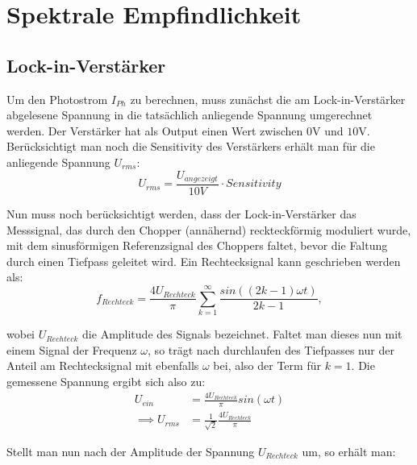 

\section{Spektrale Empfindlichkeit}
\subsection{Lock-in-Verstärker}
Um den Photostrom $I_{Ph}$ zu berechnen, muss zunächst die am Lock-in-Verstärker abgelesene Spannung in die tatsächlich anliegende Spannung umgerechnet werden. Der Verstärker hat als Output einen Wert zwischen $0$V und $10$V. Berücksichtigt man noch die Sensitivity des Verstärkers erhält man für die anliegende Spannung $U_{rms}$: \\

\begin{equation}
U_{rms} = \frac{U_{angezeigt}}{10V} \cdot Sensitivity
\end{equation}

Nun muss noch berücksichtigt werden, dass der Lock-in-Verstärker das Messsignal, das durch den Chopper (annähernd) reckteckförmig moduliert wurde, mit dem sinusförmigen Referenzsignal des Choppers faltet, bevor die Faltung durch einen Tiefpass geleitet wird. Ein Rechtecksignal kann geschrieben werden als:\\

\begin{equation}
f_{Rechteck} = \frac{4U_{Rechteck}}{\pi} \sum_{k=1}^\infty \frac{sin((2k-1)\omega t)}{2k-1}  ,
\end{equation}

wobei $U_{Rechteck}$ die Amplitude des Signals bezeichnet.
Faltet man dieses nun mit einem Signal der Frequenz $\omega$, so trägt nach durchlaufen des Tiefpasses nur der Anteil am Rechtecksignal mit ebenfalls $\omega$ bei, also der Term für $k = 1$. Die gemessene Spannung ergibt sich also zu: \\

\begin{align}
U_{ein} &= \frac{4U_{Rechteck}}{\pi} sin(\omega t) \nonumber \\ 
\implies U_{rms} &= \frac{1}{\sqrt{2}} \frac{4U_{Rechteck}}{\pi}
\end{align}

Stellt man nun nach der Amplitude der Spannung $U_{Rechteck}$ um, so erhält man:

